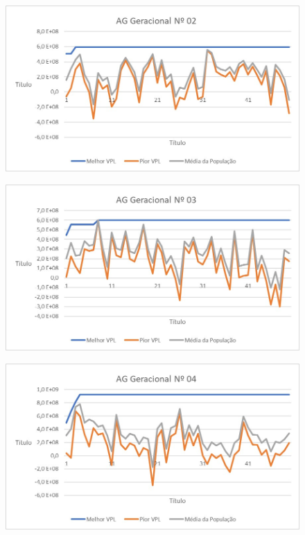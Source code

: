 \documentclass[12pt,a4paper]{report}
\begin{document}
\begin{figure}[H]
\centering

\includegraphics[scale=1]{ApB/AGG/2}

\end{figure}

\begin{figure}[H]
\centering

\includegraphics[scale=1]{ApB/AGG/3}

\end{figure}

\begin{figure}[H]
\centering

\includegraphics[scale=1]{ApB/AGG/4}

\end{figure}
\end{document}
